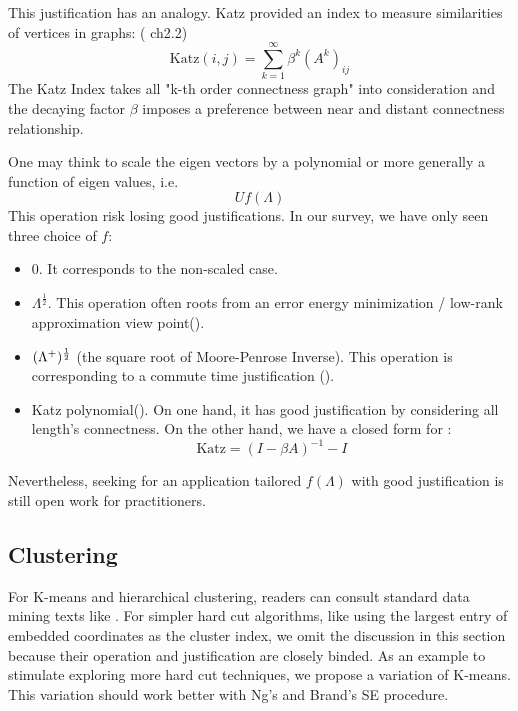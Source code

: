 This justification has an analogy. Katz\cite{katz1953catzindex}
provided an index to measure similarities of vertices in graphs:
(\cite{aggarwal2011social} ch2.2)
\begin{equation}
	\text{Katz}(i,j) = \sum_{k=1}^{\infty}{\beta^k (A^k)_{ij}}
	\label{eq:katz}
\end{equation}
The Katz Index takes all "k-th order connectness graph" into consideration
and the decaying factor $ \beta $ imposes 
a preference between near and distant connectness
relationship. 

One may think to scale the eigen vectors by a polynomial or 
more generally a function of eigen values, i.e.
\begin{equation}
	U f(\Lambda)
	\label{eq:post_scale_f}
\end{equation}
This operation risk losing good justifications. In our survey, 
we have only seen three choice of $ f $:
\begin{itemize}
	\item 0. It corresponds to the non-scaled case. 
	\item $ \Lambda^{\frac{1}{2}} $. This operation often roots 
	from an error energy minimization / low-rank approximation
	view point(\rsec{\ref{sec:lrapprox}}).
	\item $ (\Lambda^{+})^{\frac{1}{2}} $
	(the square root of Moore-Penrose Inverse\cite{wiki_mpinv}). 
	This operation is corresponding to a commute time justification
	(\rsec{\ref{sec:commute}}). 
	\item Katz polynomial(\req{\ref{eq:katz}}). On one hand, 
	it has good justification by considering all length's 
	connectness. On the other hand, we have a closed form for 
	\req{\ref{eq:katz}}:\cite{aggarwal2011social}
		\begin{equation}
			\text{Katz} = (I - \beta A)^{-1} - I
		\end{equation}
\end{itemize}
Nevertheless, seeking for an application tailored $ f(\Lambda) $
with good justification is still open work for practitioners. 

\subsection{Clustering}

For K-means and hierarchical clustering, readers
can consult standard data mining texts like \cite{jiawei2001data}.
For simpler hard cut algorithms, like using the 
largest entry of embedded coordinates as the cluster index, 
we omit the discussion in this section because their operation 
and justification are closely binded. As an example 
to stimulate exploring more hard cut techniques, we propose 
a variation of K-means. This variation should work better with 
Ng's \cite{ng2002spectral} and Brand's \cite{brand2003unifying} 
SE procedure. 

